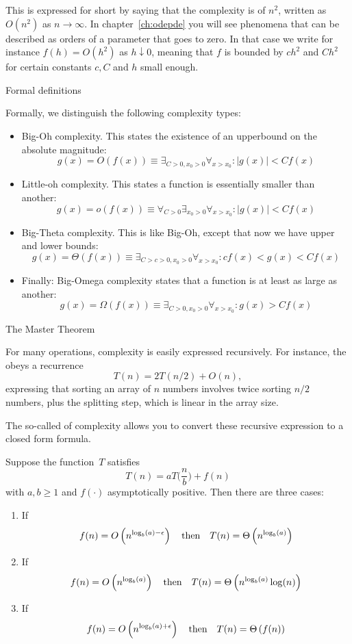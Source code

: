 This is
expressed for short by saying that the complexity is of
 $n^2$, written as~$O(n^2)$ as
$n\rightarrow\infty$.
In chapter~\ref{ch:odepde} you will see phenomena that 
can be described as orders of a parameter that goes to zero.
In that case we
write for instance $f(h)=O(h^2)$ as $h\downarrow0$, meaning that $f$
is bounded by $ch^2$ and $Ch^2$ for certain constants $c,C$ and $h$
small enough.

 {Formal definitions}

Formally, we distinguish the following complexity types:
\begin{itemize}
\item Big-Oh complexity. This states the existence of an upperbound
  on the absolute magnitude:
  \[ g(x) = O(f(x)) \equiv \exists_{C>0,x_0>0} \forall_{x>x_0} \colon |g(x)|<Cf(x) \]
\item Little-oh complexity. This states a function is essentially smaller than another:
  \[ g(x) = o(f(x)) \equiv \forall_{C>0} \exists_{x_0>0} \forall_{x>x_0} \colon |g(x)|<Cf(x) \]
\item Big-Theta complexity. This is like Big-Oh, except that now we have upper and lower bounds:
  \[ g(x) = \Theta(f(x)) \equiv \exists_{C>c>0,x_0>0} \forall_{x>x_0} \colon cf(x) < g(x) < Cf(x) \]
\item Finally: Big-Omega complexity states that a function is at least as large as another:
  \[ g(x) = \Omega(f(x)) \equiv \exists_{C>0,x_0>0} \forall_{x>x_0} \colon g(x) > Cf(x) \]
\end{itemize}

 {The Master Theorem}
\label{sec:compl-master}

For many operations, complexity is easily expressed recursively.
For instance, the 
obeys a recurrence
\[ T(n) = 2T(n/2) + O(n), \]
expressing that sorting an array of $n$ numbers involves twice sorting $n/2$ numbers,
plus the splitting step, which is linear in the array size.

The so-called  of complexity
allows you to convert these recursive expression to a closed form formula.

Suppose the function~$T$ satisfies
\[ T(n) = a T\bigl( \frac{n}{b} \bigr) + f(n) \]
with $a,b\geq 1$ and $f(\cdot)$ asymptotically positive.
Then there are three cases:
\begin{enumerate}
\item If
  \[ f(n)=O\left( n^{\log_b(a)-\epsilon} \right )
  \quad\hbox{then}\quad
  T(n) = \Theta \left( n^{\log_b(a)} \right )
  \]
\item If
  \[ f(n)=O\left( n^{\log_b(a)} \right )
  \quad\hbox{then}\quad
  T(n) = \Theta \left( n^{\log_b(a)}\log(n) \right )
  \]
\item If
  \[ f(n)=O\left( n^{\log_b(a)+\epsilon} \right )
  \quad\hbox{then}\quad
  T(n) = \Theta \left( f(n) \right )
  \]
\end{enumerate}

